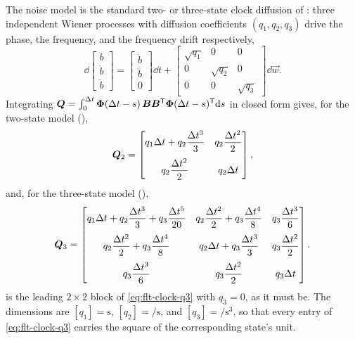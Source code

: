 The noise model is the standard two- or three-state clock diffusion of
\citet{zucca2005clock}: three independent Wiener processes with diffusion
coefficients $(q_1, q_2, q_3)$ drive the phase, the frequency, and the
frequency drift respectively,
\begin{equation}
  \label{eq:flt-clock-sde}
  \dd \begin{bmatrix} b \\ \dot{b} \\ \ddot{b} \end{bmatrix}
  = \begin{bmatrix} \dot{b} \\ \ddot{b} \\ 0 \end{bmatrix} \dd t
  + \begin{bmatrix}
      \sqrt{q_1} & 0 & 0 \\
      0 & \sqrt{q_2} & 0 \\
      0 & 0 & \sqrt{q_3}
    \end{bmatrix} \dd \vec{w} .
\end{equation}
Integrating $\bm{Q} = \int_0^{\Delta t} \bm{\Phi}(\Delta t - s)\,
\bm{B}\bm{B}^{\mathsf{T}} \bm{\Phi}(\Delta t - s)^{\mathsf{T}} \mathrm{d} s$ in closed
form gives, for the two-state model (),
\begin{equation}
  \label{eq:flt-clock-q2}
  \bm{Q}_2 =
  \begin{bmatrix}
    q_1 \Delta t + q_2\dfrac{\Delta t^3}{3} & q_2\dfrac{\Delta t^2}{2} \\[10pt]
    q_2\dfrac{\Delta t^2}{2}                & q_2 \Delta t
  \end{bmatrix},
\end{equation}
and, for the three-state model (),
\begin{equation}
  \label{eq:flt-clock-q3}
  \bm{Q}_3 =
  \begin{bmatrix}
    q_1\Delta t + q_2\dfrac{\Delta t^3}{3} + q_3\dfrac{\Delta t^5}{20}
      & q_2\dfrac{\Delta t^2}{2} + q_3\dfrac{\Delta t^4}{8}
      & q_3\dfrac{\Delta t^3}{6} \\[10pt]
    q_2\dfrac{\Delta t^2}{2} + q_3\dfrac{\Delta t^4}{8}
      & q_2\Delta t + q_3\dfrac{\Delta t^3}{3}
      & q_3\dfrac{\Delta t^2}{2} \\[10pt]
    q_3\dfrac{\Delta t^3}{6}
      & q_3\dfrac{\Delta t^2}{2}
      & q_3\Delta t
  \end{bmatrix} .
\end{equation}
 is the leading $2\times 2$ block of
\cref{eq:flt-clock-q3} with $q_3 = 0$, as it must be. The dimensions are
$[q_1] = \si{\second}$, $[q_2] = \si{\per\second}$, and
$[q_3] = \si{\per\second\cubed}$, so that every entry of
\cref{eq:flt-clock-q3} carries the square of the corresponding state's unit.

